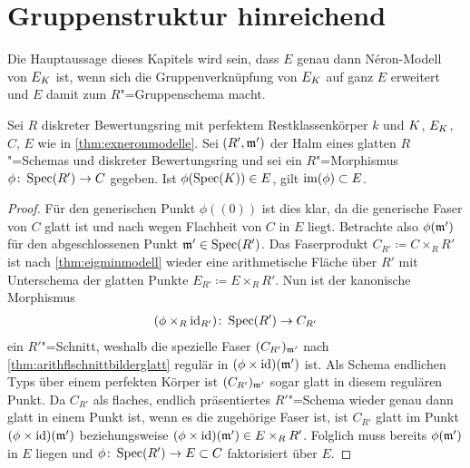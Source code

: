 \section{Gruppenstruktur hinreichend}\label{chap:gruppenstrukturhinreichend}
Die Hauptaussage dieses Kapitels wird sein, dass $E$ genau dann
Néron-Modell von $E_{K}$ ist, wenn sich die Gruppenverknüpfung von
$E_{K}$ auf ganz $E$ erweitert und $E$ damit zum $R$"=Gruppenschema
macht.
\begin{Lemma}\label{thm:schnittearithmflglatt}
  Sei $R$ diskreter Bewertungsring mit perfektem Restklassenkörper
  $k$ und $K$, $E_{K}$, $C$, $E$ wie in \ref{thm:exneronmodelle}.
  Sei $(R',\mathfrak{m}')$ der Halm eines glatten $R$"=Schemas und diskreter
  Bewertungsring
  und sei ein $R$"=Morphismus ${\phi\colon \operatorname{Spec}(R')\to C}$ gegeben.
  Ist ${\phi(\operatorname{Spec}(K))\in E}$, gilt ${\operatorname{im}(\phi)\subset E}$.
  \begin{proof}
    Für den generischen Punkt $\phi((0))$ ist dies klar, da die
    generische Faser von $C$ glatt ist und nach
    \cite[Proposition~8.5/17]{bosch} wegen Flachheit von $C$ in $E$
    liegt. 
    Betrachte also $\phi(\mathfrak{m}')$ für den abgeschlossenen Punkt
    ${\mathfrak{m}'\in\operatorname{Spec}(R')}$.
    Das Faserprodukt ${C_{R'}\coloneqq C\times_R R'}$ ist nach
    \ref{thm:eigminmodell} wieder eine arithmetische Fläche über
    $R'$ mit Unterschema der glatten Punkte
    ${E_{R'}\coloneqq E\times_R R'}$.
    Nun ist der kanonische Morphismus
    \begin{gather*}
      {(\phi\times_{R}\mathrm{id}_{R'})\colon\operatorname{Spec}(R')\to C_{R'}}
    \end{gather*}
    ein $R'$"=Schnitt, weshalb die spezielle Faser $(C_{R'})_{\mathfrak{m}'}$ nach
    \ref{thm:arithflschnittbilderglatt} regulär in
    $(\phi\times\mathrm{id})(\mathfrak{m}')$ ist.
    Als Schema endlichen Typs über einem
    perfekten Körper ist $(C_{R'})_{\mathfrak{m}'}$ sogar glatt in diesem
    regulären Punkt.
    Da $C_{R'}$ als flaches, endlich präsentiertes $R'$"=Schema wieder
    genau dann glatt in einem Punkt ist, wenn es die zugehörige Faser
    ist, ist $C_{R'}$ glatt im Punkt ${(\phi\times\mathrm{id})(\mathfrak{m}')}$
    beziehungsweise ${(\phi\times\mathrm{id})(\mathfrak{m}')\in E\times_R R'}$.
    Folglich muss bereits $\phi(\mathfrak{m}')$ in $E$ liegen und
    ${\phi\colon \operatorname{Spec}(R')\to E\subset C}$ faktorisiert über $E$.
  \end{proof}
\end{Lemma}

